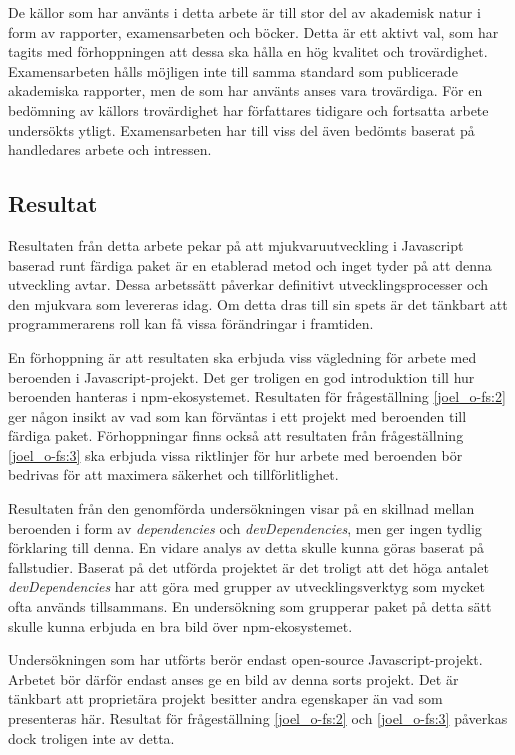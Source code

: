 De källor som har använts i detta arbete är till stor del av akademisk natur i form av rapporter, examensarbeten och böcker. Detta är ett aktivt val, som har tagits med förhoppningen att dessa ska hålla en hög kvalitet och trovärdighet. Examensarbeten hålls möjligen inte till samma standard som publicerade akademiska rapporter, men de som har använts anses vara trovärdiga. För en bedömning av källors trovärdighet har författares tidigare och fortsatta arbete undersökts ytligt. Examensarbeten har till viss del även bedömts baserat på handledares arbete och intressen.

\subsection{Resultat}
\label{subsec:tim-discussion-results}
Resultaten från detta arbete pekar på att mjukvaruutveckling i Javascript baserad runt färdiga paket är en etablerad metod och inget tyder på att denna utveckling avtar. Dessa arbetssätt påverkar definitivt utvecklingsprocesser och den mjukvara som levereras idag. Om detta dras till sin spets är det tänkbart att programmerarens roll kan få vissa förändringar i framtiden.

En förhoppning är att resultaten ska erbjuda viss vägledning för arbete med beroenden i Javascript-projekt. Det ger troligen en god introduktion till hur beroenden hanteras i npm-ekosystemet. Resultaten för frågeställning \ref{joel_o-fs:2} ger någon insikt av vad som kan förväntas i ett projekt med beroenden till färdiga paket. Förhoppningar finns också att resultaten från frågeställning \ref{joel_o-fs:3} ska erbjuda vissa riktlinjer för hur arbete med beroenden bör bedrivas för att maximera säkerhet och tillförlitlighet.

Resultaten från den genomförda undersökningen visar på en skillnad mellan beroenden i form av \textit{dependencies} och \textit{devDependencies}, men ger ingen tydlig förklaring till denna. En vidare analys av detta skulle kunna göras baserat på fallstudier. Baserat på det utförda projektet är det troligt att det höga antalet \textit{devDependencies} har att göra med grupper av utvecklingsverktyg som mycket ofta används tillsammans. En undersökning som grupperar paket på detta sätt skulle kunna erbjuda en bra bild över npm-ekosystemet.

Undersökningen som har utförts berör endast open-source Javascript-projekt. Arbetet bör därför endast anses ge en bild av denna sorts projekt. Det är tänkbart att proprietära projekt besitter andra egenskaper än vad som presenteras här. Resultat för frågeställning \ref{joel_o-fs:2} och \ref{joel_o-fs:3} påverkas dock troligen inte av detta.
